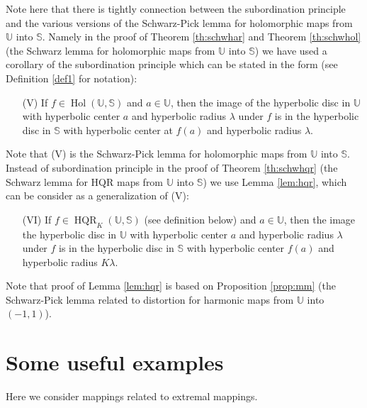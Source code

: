 \documentclass{amsart}
\newcommand{\HQR}{\mathop{\mathrm{HQR}}}
\newcommand{\Hol}{\mathop{\mathrm{Hol}}}
\begin{document}
Note here that  there is tightly connection between the subordination principle and the various versions of the Schwarz-Pick lemma for holomorphic maps from $\mathbb{U}$ into $\mathbb{S}$.
Namely  in the proof of Theorem \ref{th:schwhar} and Theorem \ref{th:schwhol} (the Schwarz lemma for holomorphic maps from $\mathbb{U}$ into $\mathbb{S}$) we have used a corollary  of the subordination principle which can be stated in the form (see Definition \ref{def1} for notation):
\begin{itemize}
\item[(V)] If  $f\in\Hol(\mathbb{U},\mathbb{S})$  and $a\in \mathbb{U}$,  then the image  of the hyperbolic disc in $\mathbb{U}$  with hyperbolic center $a$ and hyperbolic radius $\lambda$ under $f$ is in the hyperbolic disc in  $\mathbb{S}$ with hyperbolic center at $f(a)$ and hyperbolic radius $\lambda$.
\end{itemize}
Note that (V) is the Schwarz-Pick lemma for holomorphic maps from $\mathbb{U}$ into $\mathbb{S}$.
Instead of subordination principle in the proof of Theorem \ref{th:schwhqr} (the Schwarz lemma for HQR maps from $\mathbb{U}$ into $\mathbb{S}$)  we use Lemma  \ref{lem:hqr}, which can be consider as a generalization of (V):
\begin{itemize}
\item[(VI)] If  $f\in\HQR_K(\mathbb{U},\mathbb{S})$ (see definition below) and $a\in \mathbb{U}$, then the image  the hyperbolic disc in $\mathbb{U}$  with hyperbolic center $a$ and hyperbolic radius $\lambda$ under $f$ is in the hyperbolic disc in  $\mathbb{S}$ with hyperbolic center $f(a)$ and hyperbolic radius $K \lambda$.
\end{itemize}

Note that proof of  Lemma  \ref{lem:hqr} is based on   Proposition  \ref{prop:mm}   (the Schwarz-Pick lemma related to distortion    for harmonic maps  from $\mathbb{U}$ into $(-1,1)$).



\section{Some useful examples}

Here we consider mappings related to extremal mappings.
\end{document}
